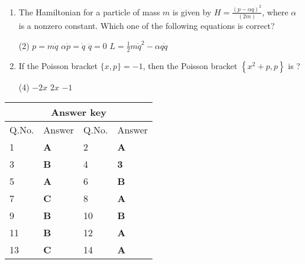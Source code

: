 \begin{enumerate}
\begin{tasks}
	\end{tasks}
	\item  The Hamiltonian for a particle of mass $m$ is given by $H=\frac{(p-\alpha q)^{2}}{(2 m)}$, where $\alpha$ is a nonzero constant. Which one of the following equations is correct?
	{}
	\begin{tasks}(2)
		\task[\textbf{a.}]$p=m \dot{q}$
		\task[\textbf{b.}]$\alpha \dot{p}=\dot{q}$
		\task[\textbf{c.}] $\ddot{q}=0$
		\task[\textbf{d.}] $L=\frac{1}{2} m \dot{q}^{2}-\alpha q \dot{q}$
	\end{tasks}
	\item  If the Poisson bracket $\{x, p\}=-1$, then the Poisson bracket $\left\{x^{2}+p, p\right\}$ is ?
	{}
	\begin{tasks}(4)
		\task[\textbf{a.}] $-2 x$
		\task[\textbf{b.}]$2 x$
		\task[\textbf{d.}] $-1$
	\end{tasks}
\end{enumerate}
\setlength\arrayrulewidth{1pt}
\begin{table}[H]
	\centering
	\begin{tabular}{|p{1.5cm}|p{1.5cm}||p{1.5cm}|p{1.5cm}|}
		\hline
		\multicolumn{4}{|c|}{\textbf{Answer key}}\\\hline\hline
		\rowcolor{ocrel}Q.No.&Answer&Q.No.&Answer\\\hline
		1&\textbf{A} &2&\textbf{A}\\\hline 
		3&\textbf{B} &4&\textbf{3} \\\hline
		5&\textbf{A} &6&\textbf{B} \\\hline
		7&\textbf{C}&8&\textbf{A}\\\hline
		9&\textbf{B}&10&\textbf{B}\\\hline
		11&\textbf{B} &12&\textbf{A}\\\hline
		13&\textbf{C}&14&\textbf{A}\\\hline
	\end{tabular}
\end{table}